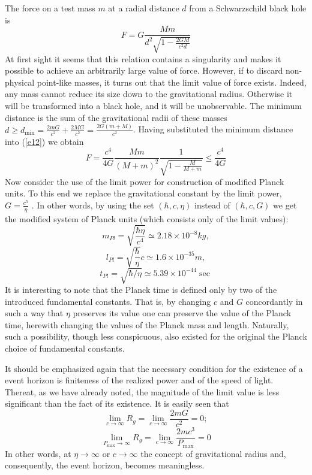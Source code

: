 \documentclass [12pt]{article}
\begin{document}
The force on a test mass $m$  at a radial distance $d$  from a Schwarzschild black hole is
\begin{equation}\label{e12}
  F = G\frac{{Mm}}{{{d^2}\sqrt {1 - \frac{{2GM}}{{{c^2}d}}} }}
\end{equation}
At first sight it seems that this relation contains a singularity and makes it possible to achieve an arbitrarily large value of force. However, if to discard non-physical point-like masses, it turns out that the limit value of force exists. Indeed, any mass cannot reduce its size down to the gravitational radius.   Otherwise it will be transformed into a black hole, and it will be unobservable. The minimum distance is the sum of the gravitational radii of these masses $d \ge {d_{\min }} = \frac{{2mG}}{{{c^2}}} + \frac{{2MG}}{{{c^2}}} = \frac{{2G\left( {m + M} \right)}}{{{c^2}}}$. Having  substituted the minimum distance into  (\ref{e12}) we obtain
\begin{equation}\label{e13}
  F = \frac{{{c^4}}}{{4G}}\frac{{Mm}}{{{{\left( {M + m} \right)}^2}}}\frac{1}{{\sqrt {1 - \frac{M}{{M + m}}} }} \le \frac{{{c^4}}}{{4G}}
\end{equation}
Now consider the use of the limit power  for construction of modified Planck units. To this end we replace the gravitational constant   by the limit power, $G = \frac{{{c^5}}}{\eta }$ . In other words, by using  the set  $\left( {\hbar ,c,\eta } \right)$ instead of $\left( {\hbar ,c,G} \right)$ we get the modified system of Planck units  (which consists only of  the limit values):
\[{m_{Pl}} = \sqrt {\frac{{\hbar \eta }}{{{c^4}}}}  \simeq 2.18 \times {10^{ - 8}}kg,\]
\[{l_{Pl}} = \sqrt {\frac{\hbar }{\eta }} c \simeq 1.6 \times {10^{ - 35}}m,\]
\begin{equation}\label{e14}
  {t_{Pl}} = \sqrt {\hbar /\eta }  \simeq 5.39 \times {10^{ - 44}}\sec
\end{equation}
It is interesting to note that the Planck time is defined only by two of the  introduced fundamental constants. That is, by changing $c$ and $G$ concordantly in such a way that  $\eta$ preserves its value one can preserve the value of the Planck time, herewith changing the values of the Planck mass and  length. Naturally, such a possibility, though less conspicuous, also existed for the original the Planck choice  of fundamental constants.

It should be emphasized again that the necessary condition for the existence of a event horizon  is finiteness of the realized power and  of the speed of light. Thereat, as we have already noted, the magnitude  of the limit value is less significant than the fact of its existence. It is easily seen that
\[\mathop {\lim }\limits_{c \to \infty } {R_g} = \mathop {\lim }\limits_{c \to \infty } \frac{{2mG}}{{{c^2}}} = 0;\]
\begin{equation}\label{e15}
  \mathop {\lim }\limits_{{P_{\max }} \to \infty } {R_g} = \mathop {\lim }\limits_{c \to \infty } \frac{{2m{c^3}}}{{{P_{\max }}}} = 0
\end{equation}
In other words, at  $\eta  \to \infty $ or $c \to \infty $ the concept of gravitational radius and, consequently, the event horizon, becomes meaningless.
\end{document}

